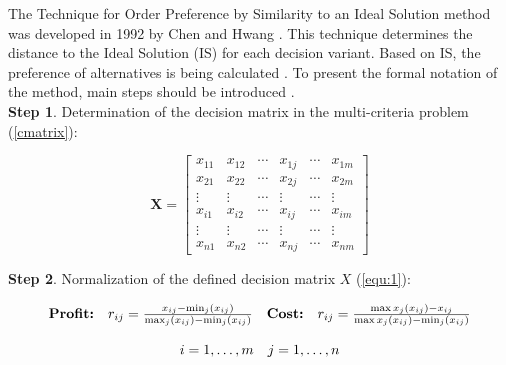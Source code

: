 The Technique for Order Preference by Similarity to an Ideal Solution method was developed in 1992 by Chen and Hwang \citep{behzadian2012state}. This technique determines the distance to the Ideal Solution (IS) for each decision variant. Based on IS, the preference of alternatives is being calculated \citep{zyoud2017bibliometric}. To present the formal notation of the method, main steps should be introduced \cite{papathanasiou2018topsis}. \\

\noindent \textbf{Step 1}. Determination of the decision matrix in the multi-criteria problem (\ref{cmatrix}):

\begin{equation}
\mathbf{X}=\left[\begin{array}{cccccc}
x_{11} & x_{12} & \cdots & x_{1 j} & \cdots & x_{1 m} \\
x_{21} & x_{22} & \cdots & x_{2 j} & \cdots & x_{2 m} \\
\vdots & \vdots & \cdots & \vdots & \cdots & \vdots \\
x_{i 1} & x_{i 2} & \cdots & x_{i j} & \cdots & x_{i m} \\
\vdots & \vdots & \cdots & \vdots & \cdots & \vdots \\
x_{n 1} & x_{n 2} & \cdots & x_{n j} & \cdots & x_{n m}
\end{array}\right]
\label{cmatrix}
\end{equation}

\noindent \textbf{Step 2}. Normalization of the defined decision matrix $X$ (\ref{equ:1}):


\begin{equation}
\begin{array}{llll}
\textbf{Profit:} & r_{i j}=\frac{x_{i j}-\min _{j}\left(x_{i j}\right)}{\max _{j}\left(x_{i j}\right)-\min _{j}\left(x_{i j}\right)} & \textbf{Cost:} & r_{i j}=\frac{\max x_{j}\left(x_{i j}\right)-x_{i j}}{\max x_{j}\left(x_{i j}\right)-\min _{j}\left(x_{i j}\right)} \\
\\
\multicolumn{4}{c}{i=1, \ldots, m \quad j=1, \ldots, n}
\end{array}
\label{equ:1}
\end{equation}

